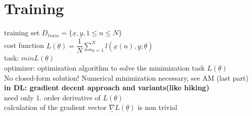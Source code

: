 \section{Training}
\textbullet training set $ D_{train} = \lbrace \underline{x} , \underline{y } , 1 \leq n \leq N \rbrace $\\
\textbullet cost function $ L(\underline{\theta}) = \dfrac{1}{N} \sum_{n=1}^{N} l(\underline{x}(n),\underline{y}; \underline{\theta}) $ \\
\textbullet task: $ min L(\underline{\theta}) $\\
\textbullet optimizer: optimization algorithm to solve the minimization task $ L(\underline{\theta}) $ \\
No closed-form solution! Numerical minimization necessary, see AM (last part) \\
\textbf{in DL: gradient decent approach and variants(like hiking)}\\
need only 1. order derivative of $ L(\underline{\theta}) $ \\
calculation of the gradient vector $  \underline{\nabla} L(\underline{\theta}) $ is non trivial \\
